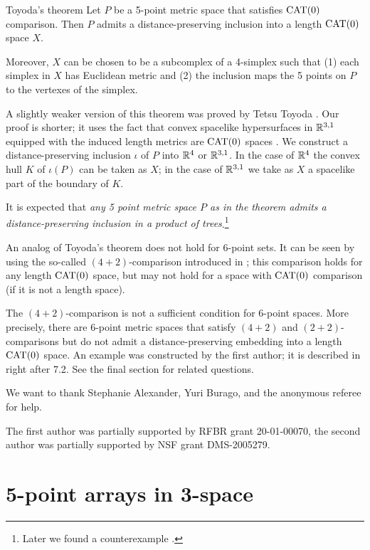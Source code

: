 \documentclass{article}
\begin{document}
\begin{thm}{Toyoda's theorem}
Let $P$ be a 5-point metric space that satisfies $\mathrm{CAT}(0)$ comparison.
Then $P$ admits a distance-preserving inclusion into a length $\mathrm{CAT}(0)$ space $X$.

Moreover,
$X$ can be chosen to be a subcomplex of a 4-simplex such that (1) each simplex in $X$ has Euclidean metric and (2) the inclusion maps the 5 points on $P$ to the vertexes of the simplex.
\end{thm}

A slightly weaker version of this theorem was proved by Tetsu Toyoda \cite{toyoda}.
Our proof is shorter; it uses the fact that convex spacelike hypersurfaces in $\mathbb{R}^{3,1}$ equipped with the induced length metrics are $\mathrm{CAT}(0)$ spaces \cite{milka}.
We construct a distance-preserving inclusion $\iota$ of $P$ into $\mathbb{R}^4$ or $\mathbb{R}^{3,1}$.
In the case of $\mathbb{R}^4$ the convex hull $K$ of $\iota(P)$ can be taken as $X$;
in the case of $\mathbb{R}^{3,1}$ we take as $X$ a spacelike part of the boundary of $K$.

It is expected that \emph{any 5 point metric space $P$ as in the theorem admits a distance-preserving inclusion in a product of trees}.\footnote{Later we found a counterexample \cite{petrunin-2021}.}

An analog of Toyoda's theorem does not hold for 6-point sets.
It can be seen by using the so-called $(4{+}2)$-comparison introduced in \cite{alexander-kapovitch-petrunin-2011};
this comparison holds for any length $\mathrm{CAT}(0)$ space, but may not hold for a space with $\mathrm{CAT}(0)$ comparison (if it is not a length space).

{\sloppy

The $(4{+}2)$-comparison is not a sufficient condition for $6$-point spaces.
More precisely, there are 6-point metric spaces that satisfy $(4{+}2)$ and $(2{+}2)$-comparisons but do not admit a distance-preserving embedding into a length $\mathrm{CAT}(0)$ space.
An example was constructed by the first author; it is described in \cite{alexander-kapovitch-petrunin-2011} right after 7.2.
See the final section for related questions.

}

We want to thank Stephanie Alexander,
Yuri Burago,
and the anonymous referee for help.

The first author was partially supported by RFBR grant   20-01-00070, 
the second author was partially supported by NSF grant DMS-2005279.

\section{5-point arrays in 3-space}
\end{document}
